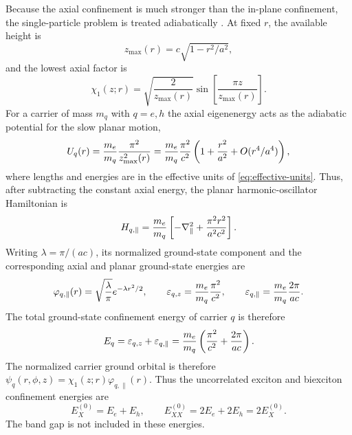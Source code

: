 Because the axial confinement is much stronger than the in-plane
confinement, the single-particle problem is treated adiabatically
\cite{hayrapetyan2012}. At fixed $r$, the available height is
\begin{equation}
 z_{\max}(r)=c\sqrt{1-r^2/a^2},
 \label{eq:zmax}
\end{equation}
and the lowest axial factor is
\begin{equation}
 \chi_1(z;r)=
 \sqrt{\frac{2}{z_{\max}(r)}}
 \sin\left[\frac{\pi z}{z_{\max}(r)}\right].
 \label{eq:axial-wavefunction}
\end{equation}
For a carrier of mass $m_q$ with $q=e,h$ the axial eigenenergy acts as the adiabatic
potential for the slow planar motion,
\begin{equation}
 U_q(r)=\frac{m_e}{m_q}\frac{\pi^2}{z_{\max}^2(r)}
 =\frac{m_e}{m_q}\frac{\pi^2}{c^2}
   \left(1+\frac{r^2}{a^2}+O(r^4/a^4)\right),
 \label{eq:adiabatic-potential}
\end{equation}
where lengths and energies are in the effective units of
\cref{eq:effective-units}. Thus, after subtracting the constant axial energy,
the planar harmonic-oscillator Hamiltonian is
\begin{equation}
 H_{q,\parallel}=\frac{m_e}{m_q}
 \left[-\nabla_{\parallel}^2+\frac{\pi^2r^2}{a^2c^2}\right].
 \label{eq:planar-hamiltonian}
\end{equation}
Writing $\lambda=\pi/(ac)$, its normalized ground-state component and the
corresponding axial and planar ground-state energies are
\begin{equation}
 \varphi_{q,\parallel}(r)=\sqrt{\frac{\lambda}{\pi}}
 e^{-\lambda r^2/2},\qquad
 \varepsilon_{q,z}=\frac{m_e}{m_q}\frac{\pi^2}{c^2},\qquad
 \varepsilon_{q,\parallel}=\frac{m_e}{m_q}\frac{2\pi}{ac}.
 \label{eq:single-particle-scales}
\end{equation}
The total ground-state confinement energy of carrier $q$ is therefore
\begin{equation}
 E_q=\varepsilon_{q,z}+\varepsilon_{q,\parallel}
 =\frac{m_e}{m_q}\left(\frac{\pi^2}{c^2}+\frac{2\pi}{ac}\right).
 \label{eq:carrier-ground-energy}
\end{equation}
The normalized carrier ground orbital is therefore
$\psi_q(r,\phi,z)=\chi_1(z;r)\varphi_{q,\parallel}(r)$. Thus the uncorrelated exciton and biexciton confinement energies are
\begin{equation}
 E_X^{(0)}=E_e+E_h,\qquad
 E_{XX}^{(0)}=2E_e+2E_h=2E_X^{(0)}.
 \label{eq:single-particle-energies}
\end{equation}
The band gap is not included in these energies.

